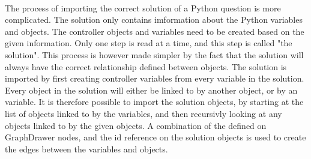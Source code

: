 \\[11pt]
The process of importing the correct solution of a Python question is more complicated. The solution only contains imformation about the Python variables and objects. The controller objects and variables need to be created based on the given information. Only one step is read at a time, and this step is called "the solution". This process is however made simpler by the fact that the solution will always have the correct relationship defined between objects. The solution is imported by first creating controller variables from every variable in the solution. Every object in the solution will either be linked to by another object, or by an variable. It is therefore possible to import the solution objects, by starting at the list of objects linked to by the variables, and then recursivly looking at any objects linked to by the given objects. A combination of the  defined on GraphDrawer nodes, and the id reference on the solution objects is used to create the edges between the variables and objects.